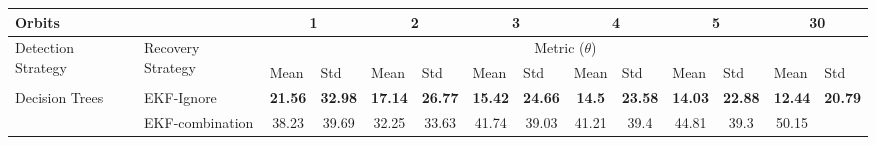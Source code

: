 \documentclass[letterpaper, 10 pt, conference]{ieeeconf}  %
\begin{document}


\begin{table*}[]
\begin{tabular}{@{}llcccccccccccc@{}}
	\toprule
	\multicolumn{2}{l}{Orbits} &
	\multicolumn{2}{c}{1} &
	\multicolumn{2}{c}{2} &
	\multicolumn{2}{c}{3} &
	\multicolumn{2}{c}{4} &
	\multicolumn{2}{c}{5} &
	\multicolumn{2}{c}{30} \\ \midrule
	\multicolumn{1}{|l|}{\multirow{2}{*}{Detection Strategy}} &
	\multicolumn{1}{l|}{\multirow{2}{*}{Recovery Strategy}} &
	\multicolumn{12}{c|}{Metric ($\theta$)} \\ \cmidrule(l){3-14} 
	\multicolumn{1}{|l|}{} &
	\multicolumn{1}{l|}{} &
	\multicolumn{1}{l|}{Mean} &
	\multicolumn{1}{l|}{Std} &
	\multicolumn{1}{l|}{Mean} &
	\multicolumn{1}{l|}{Std} &
	\multicolumn{1}{l|}{Mean} &
	\multicolumn{1}{l|}{Std} &
	\multicolumn{1}{l|}{Mean} &
	\multicolumn{1}{l|}{Std} &
	\multicolumn{1}{l|}{Mean} &
	\multicolumn{1}{l|}{Std} &
	\multicolumn{1}{l|}{Mean} &
	\multicolumn{1}{l|}{Std} \\ \midrule
	\multicolumn{1}{|l|}{\multirow{4}{*}{Decision Trees}} &
	\multicolumn{1}{l|}{EKF-Ignore} &
	\multicolumn{1}{c|}{\textbf{21.56}} &
	\multicolumn{1}{c|}{\textbf{32.98}} &
	\multicolumn{1}{c|}{\textbf{17.14}} &
	\multicolumn{1}{c|}{\textbf{26.77}} &
	\multicolumn{1}{c|}{\textbf{15.42}} &
	\multicolumn{1}{c|}{\textbf{24.66}} &
	\multicolumn{1}{c|}{\textbf{14.5}} &
	\multicolumn{1}{c|}{\textbf{23.58}} &
	\multicolumn{1}{c|}{\textbf{14.03}} &
	\multicolumn{1}{c|}{\textbf{22.88}} &
	\multicolumn{1}{c|}{\textbf{12.44}} &
	\multicolumn{1}{c|}{\textbf{20.79}} \\ \cmidrule(l){2-14} 
	\multicolumn{1}{|l|}{} &
	\multicolumn{1}{l|}{EKF-combination} &
	\multicolumn{1}{c|}{38.23} &
	\multicolumn{1}{c|}{39.69} &
	\multicolumn{1}{c|}{32.25} &
	\multicolumn{1}{c|}{33.63} &
	\multicolumn{1}{c|}{41.74} &
	\multicolumn{1}{c|}{39.03} &
	\multicolumn{1}{c|}{41.21} &
	\multicolumn{1}{c|}{39.4} &
	\multicolumn{1}{c|}{44.81} &
	\multicolumn{1}{c|}{39.3} &
	\multicolumn{1}{c|}{50.15} &

\end{tabular}
\end{table*}
\end{document}
